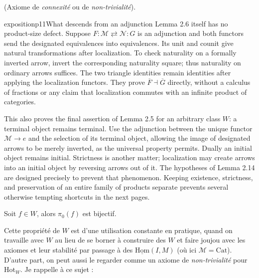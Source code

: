 \begin{description}[leftmargin=7em, labelwidth=6em]
\item[Loc (5)] (Axiome de \textit{connexité} ou de \textit{non-trivialité}).

\begin{dcomment}{exposition}{p11}{What descends from an adjunction}
Lemma 2.6 itself has no product-size defect. Suppose $F:\mathcal M\rightleftarrows\mathcal N:G$ is an adjunction and both functors send the designated equivalences into equivalences. Its unit and counit give natural transformations after localization. To check naturality on a formally inverted arrow, invert the corresponding naturality square; thus naturality on ordinary arrows suffices. The two triangle identities remain identities after applying the localization functors. They prove $\overline F\dashv\overline G$ directly, without a calculus of fractions or any claim that localization commutes with an infinite product of categories.

This also proves the final assertion of Lemma 2.5 for an arbitrary class $W$: a terminal object remains terminal. Use the adjunction between the unique functor $\mathcal M\to e$ and the selection of its terminal object, allowing the image of designated arrows to be merely inverted, as the universal property permits. Dually an initial object remains initial. Strictness is another matter; localization may create arrows into an initial object by reversing arrows out of it. The hypotheses of Lemma 2.14 are designed precisely to prevent that phenomenon. Keeping existence, strictness, and preservation of an entire family of products separate prevents several otherwise tempting shortcuts in the next pages.
\end{dcomment}


Soit $f \in W$, alors $\pi_0(f)$ est bijectif.
\end{description}

Cette propriété de $W$ est d'une utilisation constante en pratique, quand on travaille avec $W$ au lieu de se borner à construire des $W$ et faire joujou avec les axiomes et leur stabilité par passage à des $\underline{\mathrm{Hom}}(I, M)$ (où ici $\mathcal{M} = \mathrm{Cat}$). D'autre part, on peut aussi le regarder comme un axiome de \textit{non-trivialité} pour $\mathrm{Hot}_W$. Je rappelle à ce sujet :

